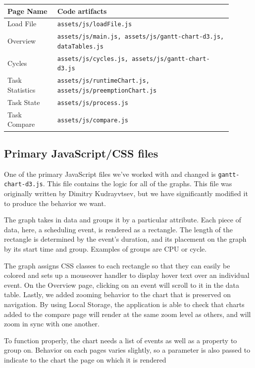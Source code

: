 \documentclass{hmcclinic}
\begin{document}
  \begin{center}
    \begin{tabular}{p{0.2\linewidth}p{0.7\linewidth}}
     \toprule
      Page Name       & Code artifacts     \\
      \midrule
      Load File       & \texttt{assets/js/loadFile.js}\\
      Overview        & \texttt{assets/js/main.js, assets/js/gantt-chart-d3.js, dataTables.js}\\
      Cycles          & \texttt{assets/js/cycles.js, assets/js/gantt-chart-d3.js}\\
      Task Statistics & \texttt{assets/js/runtimeChart.js, assets/js/preemptionChart.js}\\
      Task State      & \texttt{assets/js/process.js}\\
      Task Compare    & \texttt{assets/js/compare.js}\\
    \bottomrule
    \end{tabular}
  \end{center}


  \subsection{Primary JavaScript/CSS files}
  One of the primary JavaScript files we've worked
  with and changed is \texttt{gantt-chart-d3.js}. This file contains the logic for all of the
  graphs. This file was originally written by Dimitry Kudrayvtsev, %
 but we have significantly modified it to produce the behavior we want.

  The graph takes in data and groups it by a particular attribute. Each piece
  of data, here, a scheduling event, is rendered as a rectangle. The
  length of the rectangle is determined by the event's duration, and its
  placement on the graph by its start time and group. Examples of groups are
  CPU or cycle.

  The graph assigns CSS classes to each rectangle so that they can easily be
  colored and sets up a mouseover handler to display hover text
  over an individual event. On the Overview page, clicking
  on an event will scroll to it in the data table.
  Lastly, we added zooming behavior to the chart that is
  preserved on navigation. By using Local Storage, the application is
  able to check that charts added to the compare page will render at the
  same zoom level as others, and will zoom in sync with one another.

  To function properly, the chart needs a list of events
  as well as a property to group on. Behavior on each pages varies
  slightly, so a parameter is also passed to indicate to the chart the page on
  which it is rendered
\end{document}
